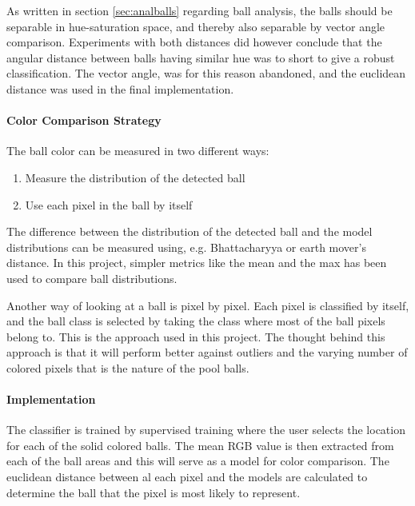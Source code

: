 As written in section \ref{sec:analballs} regarding ball analysis, the balls should be separable in hue-saturation space, and thereby also separable by vector angle comparison. Experiments with both distances did however conclude that the angular distance between balls having similar hue was to short to give a robust classification. The vector angle, was for this reason abandoned, and the euclidean distance was used in the final implementation.

\paragraph{Color Comparison Strategy}
The ball color can be measured in two different ways: 
\begin{enumerate}
  \item Measure the distribution of the detected ball
  \item Use each pixel in the ball by itself
\end{enumerate}
The difference between the distribution of the detected ball and the model distributions can be measured using, e.g. Bhattacharyya or earth mover's distance. In this project, simpler metrics like the mean and the max has been used to compare ball distributions. 

Another way of looking at a ball is pixel by pixel. Each pixel is classified by itself, and the ball class is selected by taking the class where most of the ball pixels belong to. This is the approach used in this project. The thought behind this approach is that it will perform better against outliers and the varying number of colored pixels that is the nature of the pool balls. 

\paragraph{Implementation}
The classifier is trained by supervised training where the user selects the location for each of the solid colored balls. The mean RGB value is then extracted from each of the ball areas and this will serve as a model for color comparison. 
The euclidean distance between al each pixel and the models are calculated to determine the ball that the pixel is most likely to represent.

